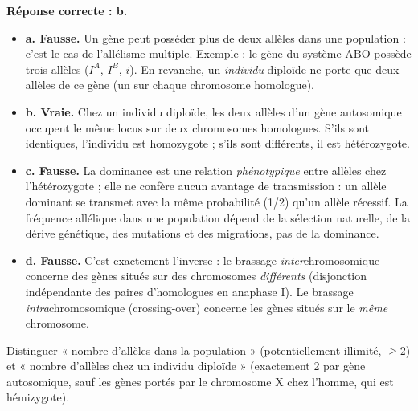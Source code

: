 \documentclass[11pt]{article}
\newcommand{\cle}[1]{{\popxbold\color{popdark}#1}}
\begin{document}
\begin{corrige}
\textbf{Réponse correcte : b.}

\begin{itemize}
    \item \textbf{a. Fausse.} Un gène peut posséder plus de deux allèles dans une population : c'est le cas de l'\cle{allélisme multiple}. Exemple : le gène du système ABO possède trois allèles ($I^A$, $I^B$, $i$). En revanche, un \emph{individu} diploïde ne porte que deux allèles de ce gène (un sur chaque chromosome homologue).
    \item \textbf{b. Vraie.} Chez un individu diploïde, les deux allèles d'un gène autosomique occupent le même \cle{locus} sur deux chromosomes homologues. S'ils sont identiques, l'individu est \cle{homozygote} ; s'ils sont différents, il est \cle{hétérozygote}.
    \item \textbf{c. Fausse.} La dominance est une relation \emph{phénotypique} entre allèles chez l'hétérozygote ; elle ne confère aucun avantage de transmission : un allèle dominant se transmet avec la même probabilité (1/2) qu'un allèle récessif. La fréquence allélique dans une population dépend de la sélection naturelle, de la dérive génétique, des mutations et des migrations, pas de la dominance.
    \item \textbf{d. Fausse.} C'est exactement l'inverse : le brassage \emph{inter}chromosomique concerne des gènes situés sur des chromosomes \emph{différents} (disjonction indépendante des paires d'homologues en anaphase I). Le brassage \emph{intra}chromosomique (crossing-over) concerne les gènes situés sur le \emph{même} chromosome.
\end{itemize}

\begin{attention}
Distinguer « nombre d'allèles dans la population » (potentiellement illimité, $\geq 2$) et « nombre d'allèles chez un individu diploïde » (exactement 2 par gène autosomique, sauf les gènes portés par le chromosome X chez l'homme, qui est hémizygote).
\end{attention}
\end{corrige}
\end{document}

